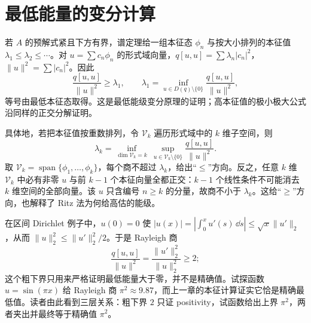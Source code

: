 \section{最低能量的变分计算}

若 \(A\) 的预解式紧且下方有界，谱定理给一组本征态 \(\phi_n\) 与按大小排列的本征值 \(\lambda_1\le\lambda_2\le\cdots\)。对 \(u=\sum c_n\phi_n\) 的形式域向量，\(q[u,u]=\sum\lambda_n|c_n|^2\)，\(\|u\|^2=\sum|c_n|^2\)。因此
\[
\frac{q[u,u]}{\|u\|^2}\ge\lambda_1,
\qquad \lambda_1=\inf_{u\in D(q)\setminus\{0\}}\frac{q[u,u]}{\|u\|^2},
\]
等号由最低本征态取得。这是最低能级变分原理的证明；高本征值的极小极大公式沿同样的正交分解证明。

具体地，若把本征值按重数排列，令 \(\mathcal V_k\) 遍历形式域中的 \(k\) 维子空间，则
\[
\lambda_k=\inf_{\dim\mathcal V_k=k}\ \sup_{u\in\mathcal V_k\setminus\{0\}}
\frac{q[u,u]}{\|u\|^2}.
\]
取 \(\mathcal V_k=\operatorname{span}\{\phi_1,\ldots,\phi_k\}\)，每个商不超过 \(\lambda_k\)，给出“\(\le\)”方向。反之，任意 \(k\) 维 \(\mathcal V_k\) 中必有非零 \(u\) 与前 \(k-1\) 个本征向量全都正交：\(k-1\) 个线性条件不可能消去 \(k\) 维空间的全部向量。该 \(u\) 只含编号 \(n\ge k\) 的分量，故商不小于 \(\lambda_k\)。这给“\(\ge\)”方向，也解释了 Ritz 法为何给高估的能级。

在区间 Dirichlet 例子中，\(u(0)=0\) 使 \(|u(x)|=|\int_0^xu'(s)\,\dd s|\le\sqrt{x}\|u'\|_2\)，从而 \(\|u\|_2^2\le\|u'\|_2^2/2\)。于是 Rayleigh 商
\[
\frac{q[u,u]}{\|u\|^2}=\frac{\|u'\|_2^2}{\|u\|_2^2}\ge2;
\]
这个粗下界只用来严格证明最低能量大于零，并不是精确值。试探函数 \(u=\sin(\pi x)\) 给 Rayleigh 商 \(\pi^2\approx9.87\)，而上一章的本征计算证实它恰是精确最低值。读者由此看到三层关系：粗下界 \(2\) 只证 positivity，试函数给出上界 \(\pi^2\)，两者夹出并最终等于精确值 \(\pi^2\)。


